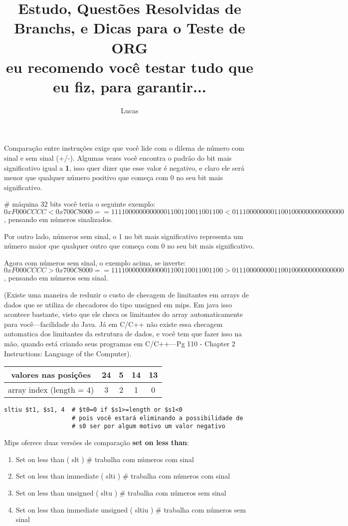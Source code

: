 \documentclass{article}
\author{Lucas}
\title{Estudo, Questões Resolvidas de Branchs, e Dicas para o Teste de ORG\\
\small{eu recomendo você testar tudo que eu fiz, para garantir...}}
\begin{document}
\maketitle

Comparação entre instruções exige que você lide com o dilema de número com sinal
e sem sinal (+/-). Algumas vezes você encontra o padrão do bit mais
significativo igual a \textbf{1}, isso quer dizer que esse valor é negativo, e
claro ele será menor que qualquer número positivo que começa com 0 no seu bit
mais significativo.

\# máquina 32 bits você teria o seguinte exemplo:\\
$0xF000CCCC < 0x700C8000 == 11110000000000001100110011001100 <
01110000000011001000000000000000$, pensando em números sinalizados.

Por outro lado, números sem sinal, o 1 no bit mais significativo representa um
número maior que qualquer outro que começa com 0 no seu bit mais significativo.

Agora com números sem sinal, o exemplo acima, se inverte:\\
$0xF000CCCC > 0x700C8000 == 11110000000000001100110011001100 >
01110000000011001000000000000000$, pensando em números sem sinal.

(Existe uma maneira de reduzir o custo de checagem de limitantes em arrays de
dados que se utiliza de checadores do tipo unsigned em mips. Em java isso
acontece bastante, visto que ele checa os limitantes do array automaticamente
para você---facilidade do Java. Já em C/C++ não existe essa checagem automatica
dos limitantes da estrutura de dados, e você tem que fazer isso na mão, quando
está criando seus programas em C/C++---Pg 110 - Chapter 2  Instructions:
Language of the Computer).

\begin{tabular}{|c|c|c|c|c|}
\hline valores nas posições & 24 & 5 & 14 & 13 \\
\hline array index (length = 4) & 3 & 2 & 1 & 0 \\
\hline
\end{tabular}

\begin{verbatim}
sltiu $t1, $s1, 4  # $t0=0 if $s1>=length or $s1<0
                   # pois você estará eliminando a possibilidade de
                   # s0 ser por algum motivo um valor negativo
\end{verbatim}

Mips oferece duas versões de comparação \textbf{set on less than}:
\begin{enumerate}
\item Set on less than ( slt ) \# trabalha com números com sinal
\item Set on less than immediate ( slti ) \# trabalha com números com sinal

\item Set on less than unsigned ( sltu ) \# trabalha com números sem sinal
\item Set on less than immediate unsigned ( sltiu ) \# trabalha com números sem
sinal
\end{enumerate}
\end{document}
